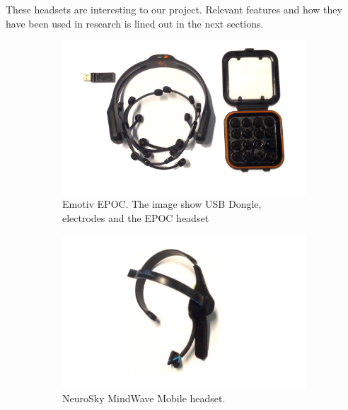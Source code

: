 \documentclass[a4paper,10pt,english,lof,lot,twoside]{puthesis}
\begin{document}
These headsets are interesting to our project. Relevant features and how they
have been used in research is lined out in the next sections.

\begin{figure}
\centering
\capstart
\begin{subfigure}[t]{0.45\linewidth}
\centering
\capstart

\includegraphics[width=1.000\linewidth]{bci-emotiv-epoc.jpg}
\caption[Emotiv EPOC]{Emotiv EPOC. The image show USB Dongle, electrodes and the EPOC headset}\label{ch-background/index:fig-background-consumer-bcis-epoc}\end{subfigure}
\begin{subfigure}[t]{0.45\linewidth}
\centering
\capstart

\includegraphics[width=1.000\linewidth]{bci-neurosky-mindwave-mobile.jpg}
\caption[NeuroSky MindWave Mobile]{NeuroSky MindWave Mobile headset.}\label{ch-background/index:fig-background-consumer-bcis-mindwave}\end{subfigure}
\begin{subfigure}[t]{0.45\linewidth}
\centering
\capstart


\end{subfigure}
\end{figure}
\end{document}
